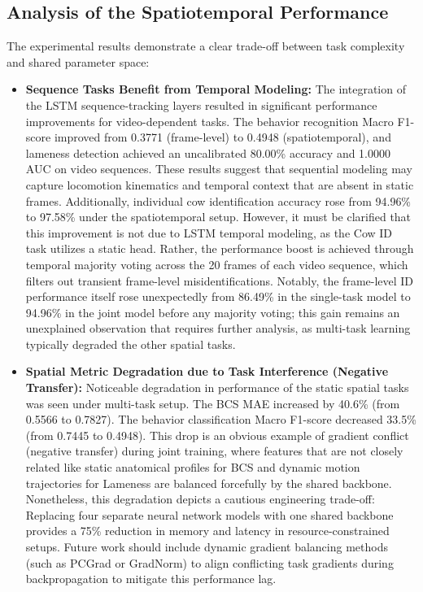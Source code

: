 \subsection{Analysis of the Spatiotemporal Performance}
The experimental results demonstrate a clear trade-off between task complexity and shared parameter space:
\begin{itemize}
    \item \textbf{Sequence Tasks Benefit from Temporal Modeling:} The integration of the LSTM sequence-tracking layers resulted in significant performance improvements for video-dependent tasks. The behavior recognition Macro F1-score improved from 0.3771 (frame-level) to 0.4948 (spatiotemporal), and lameness detection achieved an uncalibrated 80.00\% accuracy and 1.0000 AUC on video sequences. These results suggest that sequential modeling may capture locomotion kinematics and temporal context that are absent in static frames. Additionally, individual cow identification accuracy rose from 94.96\% to 97.58\% under the spatiotemporal setup. However, it must be clarified that this improvement is not due to LSTM temporal modeling, as the Cow ID task utilizes a static head. Rather, the performance boost is achieved through temporal majority voting across the 20 frames of each video sequence, which filters out transient frame-level misidentifications. Notably, the frame-level ID performance itself rose unexpectedly from 86.49\% in the single-task model to 94.96\% in the joint model before any majority voting; this gain remains an unexplained observation that requires further analysis, as multi-task learning typically degraded the other spatial tasks.
    \item \textbf{Spatial Metric Degradation due to Task Interference (Negative Transfer):} Noticeable degradation in performance of the static spatial tasks was seen under multi-task setup. The BCS MAE increased by 40.6\% (from 0.5566 to 0.7827). The behavior classification Macro F1-score decreased 33.5\% (from 0.7445 to 0.4948). This drop is an obvious example of gradient conflict (negative transfer) during joint training, where features that are not closely related like static anatomical profiles for BCS and dynamic motion trajectories for Lameness are balanced forcefully by the shared backbone. Nonetheless, this degradation depicts a cautious engineering trade-off: Replacing four separate neural network models with one shared backbone provides a 75\% reduction in memory and latency in resource-constrained setups. Future work should include dynamic gradient balancing methods (such as PCGrad or GradNorm) to align conflicting task gradients during backpropagation to mitigate this performance lag.
\end{itemize}

